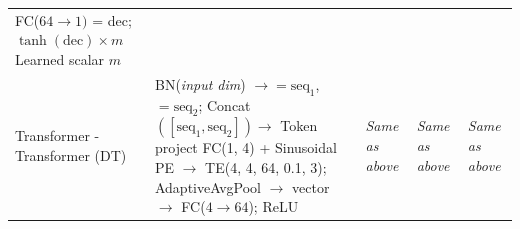\begin{table}
\begin{tabular}{
    >{\centering}p{3cm} %
    p{5.8cm}  p{3.0cm}  p{4.4cm} p{5.8cm}}
FC($64\rightarrow 1)$ = dec; \newline
$\tanh(\text{dec}) \times m$ \newline
Learned scalar $m$ \\[4pt]
%
Transformer - Transformer (DT) &
BN(\emph{input dim}) $\rightarrow$\newline 
[C1D(1,1,3,2); BN; ReLU]$=\text{seq}_1$, \newline
[C1D(1,1,300,50); BN; ReLU]$=\text{seq}_2$; \newline
Concat$([\text{seq}_1,\text{seq}_2])\rightarrow$ \newline
Token project FC(1, 4) \newline 
+ Sinusoidal PE $\rightarrow$ \newline
TE(4, 4, 64, 0.1, 3); \newline
AdaptiveAvgPool $\rightarrow$ vector $\rightarrow$\newline
FC($4\rightarrow 64$);\newline
ReLU&
\emph{Same as above} &
\emph{Same as above} &
\emph{Same as above} \\
\bottomrule
\end{tabular}
\end{table}

